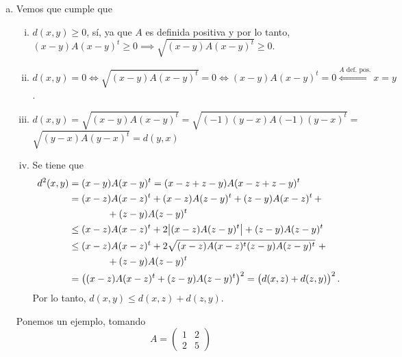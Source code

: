 \begin{ej}
\begin{enumerate}[(a)]
		\item Vemos que cumple que
			\begin{enumerate}[i)]
				\item $d(x, y) \geq 0$, sí, ya que $A$ es definida positiva y por lo tanto, $(x-y)A(x-y)^t \geq 0 \implies \sqrt{(x-y)A(x-y)^t} \geq 0$.
				\item $d(x, y) = 0 \iff \sqrt{(x-y)A(x-y)^t} = 0 \iff (x-y)A(x-y)^t = 0 \stackrel{A \text{ def. pos.}}{\iff} x = y$.
				\item $d(x, y) = \sqrt{(x-y)A(x-y)^t} = \sqrt{(-1)(y-x)A(-1)(y-x)^t} =$ \\ $\sqrt{(y-x)A(y-x)^t} = d(y, x)$
				\item Se tiene que
					\begin{align*}
						d^2(x,y) &= (x-y)A(x-y)^t = (x-z+z-y)A(x-z+z-y)^t \\
						&= (x-z)A(x-z)^t + (x-z)A(z-y)^t + (z-y)A(x-z)^t\, + \\
						&\qquad\qquad + (z-y)A(z-y)^t \\
						&\leq (x-z)A(x-z)^t + 2 \abs{(x-z)A(z-y)^t} + (z-y)A(z-y)^t \\
						&\leq (x-z)A(x-z)^t + 2 \sqrt{(x-z)A(x-z)^t(z-y)A(z-y)^t} \,\,+ \\
						&\qquad\qquad + (z-y)A(z-y)^t \\
						&= \left( (x-z)A(x-z)^t + (z-y)A(z-y)^t \right)^2 = \left( d(x,z) + d(z,y) \right)^2.
					\end{align*}
					Por lo tanto, $d(x,y) \leq d(x,z) + d(z,y)$.
			\end{enumerate}
			Ponemos un ejemplo, tomando
			\[
				A =
				\begin{pmatrix}
					1 & 2 \\
					2 & 5
				\end{pmatrix}
			\]
			\begin{center}
				
			\end{center}
	\end{enumerate}
\end{ej}

